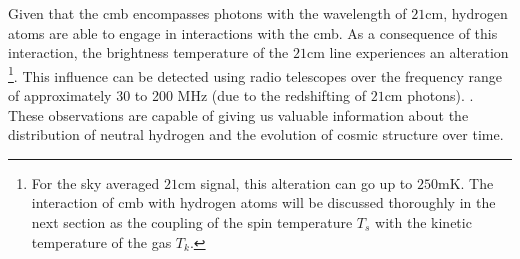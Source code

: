\documentclass[12pt, TexShade, letterpaper]{report}
\begin{document}
Given that the \gls{cmb} encompasses photons with the wavelength of $\mathrm{21cm}$, hydrogen atoms are able to engage in interactions with the \gls{cmb}. As a consequence of this interaction, the brightness temperature of the $\mathrm{21cm}$ line experiences an alteration \footnote{For the sky averaged $\mathrm{21cm}$ signal, this alteration can go up to $\mathrm{250mK}$. The interaction of \gls{cmb} with hydrogen atoms will be discussed thoroughly in the next section as the coupling of the spin temperature $T_s$ with the kinetic temperature of the gas $T_k$.}. This influence can be detected using radio telescopes over the frequency range of approximately 30 to 200 $\mathrm{MHz}$ (due to the redshifting of $\mathrm{21cm}$ photons). \cite{low_frequency}. These observations are capable of giving us valuable information about the distribution of neutral hydrogen and the evolution of cosmic structure over time\cite{low_frequency}.\par
\end{document}
